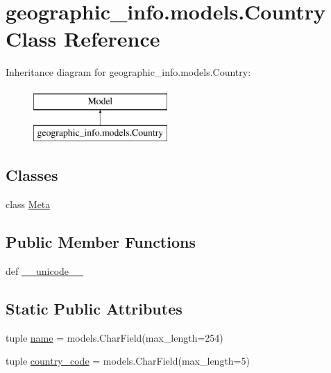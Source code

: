 \hypertarget{classgeographic__info_1_1models_1_1_country}{\section{geographic\-\_\-info.\-models.\-Country Class Reference}
\label{classgeographic__info_1_1models_1_1_country}
}
Inheritance diagram for geographic\-\_\-info.\-models.\-Country\-:\begin{figure}[H]
\begin{center}
\leavevmode
\includegraphics[height=2.000000cm]{classgeographic__info_1_1models_1_1_country}
\end{center}
\end{figure}
\subsection*{Classes}
\begin{DoxyCompactItemize}
\item 
class \hyperlink{classgeographic__info_1_1models_1_1_country_1_1_meta}{Meta}
\end{DoxyCompactItemize}
\subsection*{Public Member Functions}
\begin{DoxyCompactItemize}
\item 
def \hyperlink{classgeographic__info_1_1models_1_1_country_aa2c548cd28998b8891d2eb9e01f170f5}{\-\_\-\-\_\-unicode\-\_\-\-\_\-}
\end{DoxyCompactItemize}
\subsection*{Static Public Attributes}
\begin{DoxyCompactItemize}
\item 
tuple \hyperlink{classgeographic__info_1_1models_1_1_country_a0616dd46ddf11cf93a6ad4eecc9097ef}{name} = models.\-Char\-Field(max\-\_\-length=254)
\item 
tuple \hyperlink{classgeographic__info_1_1models_1_1_country_ad3d580f3606575354ad862ca797db0c5}{country\-\_\-code} = models.\-Char\-Field(max\-\_\-length=5)
\end{DoxyCompactItemize}


